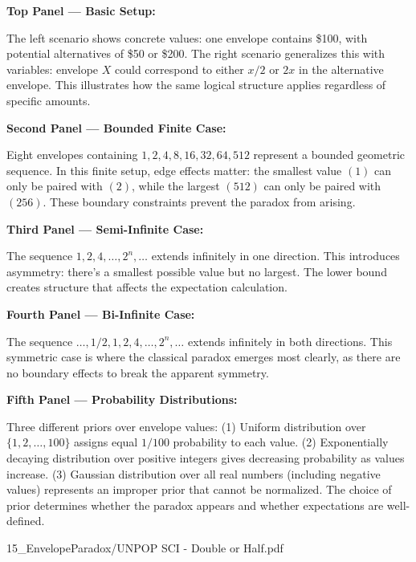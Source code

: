 \begin{SideNotePage}{
  \textbf{Top Panel — Basic Setup:} \par The left scenario shows concrete values: one envelope contains \$100, with potential alternatives of \$50 or \$200. The right scenario generalizes this with variables: envelope $X$ could correspond to either $x/2$ or $2x$ in the alternative envelope. This illustrates how the same logical structure applies regardless of specific amounts.

  \vspace{1em}
  \textbf{Second Panel — Bounded Finite Case:} \par Eight envelopes containing $1, 2, 4, 8, 16, 32, 64, 512$ represent a bounded geometric sequence. In this finite setup, edge effects matter: the smallest value $(1)$ can only be paired with $(2)$, while the largest $(512)$ can only be paired with $(256)$. These boundary constraints prevent the paradox from arising.

  \vspace{1em}
  \textbf{Third Panel — Semi-Infinite Case:} \par The sequence $1, 2, 4, \ldots, 2^n, \ldots$ extends infinitely in one direction. This introduces asymmetry: there's a smallest possible value but no largest. The lower bound creates structure that affects the expectation calculation.

  \vspace{1em}
  \textbf{Fourth Panel — Bi-Infinite Case:} \par The sequence $\ldots, 1/2, 1, 2, 4, \ldots, 2^n, \ldots$ extends infinitely in both directions. This symmetric case is where the classical paradox emerges most clearly, as there are no boundary effects to break the apparent symmetry.

  \vspace{1em}
  \textbf{Fifth Panel — Probability Distributions:} \par Three different priors over envelope values: (1) Uniform distribution over $\{1, 2, \ldots, 100\}$ assigns equal $1/100$ probability to each value. (2) Exponentially decaying distribution over positive integers gives decreasing probability as values increase. (3) Gaussian distribution over all real numbers (including negative values) represents an improper prior that cannot be normalized. The choice of prior determines whether the paradox appears and whether expectations are well-defined.
}{15_EnvelopeParadox/UNPOP SCI - Double or Half.pdf}
\end{SideNotePage}
